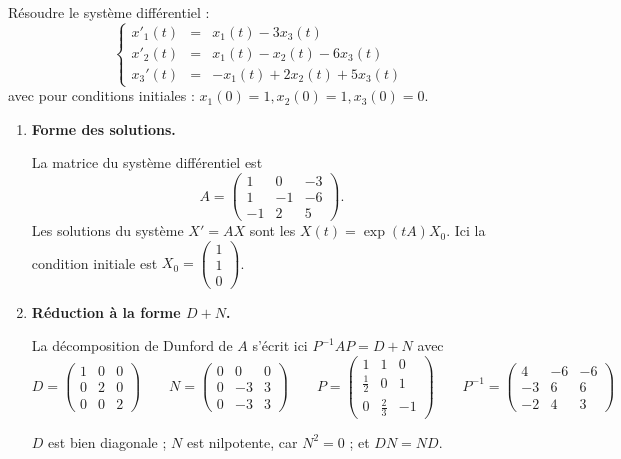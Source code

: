 \documentclass[12pt, class=report,crop=false]{standalone}
\begin{document}
\begin{exemple}
Résoudre le système différentiel :
\[\left\{\begin{array}{lcl}
x'_1(t) &= & x_1(t) -3x_3(t)\\
x'_2(t) & = & x_1(t) - x_2(t) - 6x_3(t)\\
x_3'(t) & = & -x_1(t)+2x_2(t) + 5x_3(t)
\end{array}\right.\]
avec pour \og{}conditions initiales\fg{} : $x_1(0) = 1,x_2(0) = 1, x_3(0) = 0$.


\begin{enumerate}

  \item \textbf{Forme des solutions.} 
  
  La matrice du système différentiel est 
  $$A = \begin{pmatrix}1&0&-3\\1&-1&-6\\-1&2&5\end{pmatrix}.$$
  Les solutions du système $X'=AX$ sont les 
  $X(t) = \exp ( tA) X_0$.
  Ici la condition initiale est 
  $X_0 = \left(\begin{smallmatrix}1\\1\\0\end{smallmatrix}\right)$. 
  
  
  \item \textbf{Réduction à la forme $D + N$.} 
  
  La décomposition de Dunford de $A$ s'écrit ici $P^{-1}AP = D+N$
  avec
  $$
  D = \begin{pmatrix}1&0&0\\0&2&0\\0&0&2\end{pmatrix}
  \qquad
  N = \begin{pmatrix}0&0&0\\0&-3&3\\0&-3&3\end{pmatrix}
  \qquad
  P = \begin{pmatrix}1&1&0\\\frac12&0&1\\0&\frac23&-1\end{pmatrix}
  \qquad
  P^{-1} = \begin{pmatrix}4 & -6 & -6 \\-3 & 6 & 6 \\-2 & 4 & 3\end{pmatrix}
  $$
   
  
  $D$ est bien diagonale ; $N$ est nilpotente, car $N^2 = 0$ ; et $DN=ND$.
  

\end{enumerate}
\end{exemple}
\end{document}
